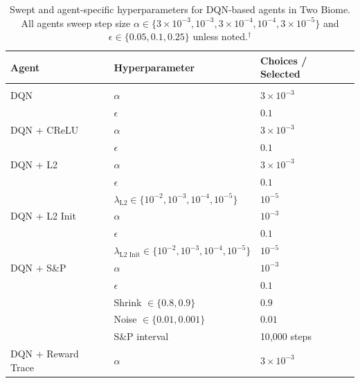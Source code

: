 \begin{table}[H]
    \caption{Swept and agent-specific hyperparameters for DQN-based agents in Two Biome. All agents sweep step size $\alpha \in \{3 \times 10^{-3}, 10^{-3}, 3 \times 10^{-4}, 10^{-4}, 3 \times 10^{-5}\}$ and $\epsilon \in \{0.05, 0.1, 0.25\}$ unless noted.$^\dagger$}
    \begin{center}
        \begin{tabular}{lll}
            \multicolumn{1}{l}{\bf Agent} & \multicolumn{1}{l}{\bf Hyperparameter} & \multicolumn{1}{l}{\bf Choices / Selected}
            \\ \hline \\
            DQN                  & $\alpha$       & $3 \times 10^{-3}$ \\
                                 & $\epsilon$     & $0.1$ \\[4pt]
            DQN + CReLU          & $\alpha$       & $3 \times 10^{-3}$ \\
                                 & $\epsilon$     & $0.1$ \\[4pt]
            DQN + L2             & $\alpha$       & $3 \times 10^{-3}$ \\
                                 & $\epsilon$     & $0.1$ \\
                                 & $\lambda_{\text{L2}} \in \{10^{-2}, 10^{-3}, 10^{-4}, 10^{-5}\}$ & $10^{-5}$ \\[4pt]
            DQN + L2 Init        & $\alpha$       & $10^{-3}$ \\
                                 & $\epsilon$     & $0.1$ \\
                                 & $\lambda_{\text{L2 Init}} \in \{10^{-2}, 10^{-3}, 10^{-4}, 10^{-5}\}$ & $10^{-5}$ \\[4pt]
            DQN + S\&P           & $\alpha$       & $10^{-3}$ \\
                                 & $\epsilon$     & $0.1$ \\
                                 & Shrink $\in \{0.8, 0.9\}$   & $0.9$ \\
                                 & Noise $\in \{0.01, 0.001\}$ & $0.01$ \\
                                 & S\&P interval  & 10{,}000 steps \\[4pt]
            DQN + Reward Trace   & $\alpha$       & $3 \times 10^{-3}$ \\

\end{tabular}
\end{center}
\end{table}
